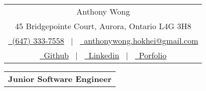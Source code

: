 \documentclass[a4paper,11pt]{article}
\begin{document}

\pagestyle{empty} 




\begin{tabularx}{\linewidth}{@{} C @{}}
\Huge{Anthony Wong} \\[7.5pt]
45 Bridgepointe Court, Aurora, Ontario L4G 3H8 \\
\href{tel:+1              (647) 333-7558}{\raisebox{-0.05\height}\               (647) 333-7558} \ $|$ \
\href{mailto:anthonywong.hokhei@gmail.com}{\raisebox{-0.05\height}\ anthonywong.hokhei@gmail.com} \\


        \href{https://github.com/anth0nywong}{\raisebox{-0.05\height}\ Github} \ $|$ \
        \href{https://www.linkedin.com/in/anth0nywong/}{\raisebox{-0.05\height}\ Linkedin} \ $|$ \
        \href{https://intro.anthonyhhwong.link/}{\raisebox{-0.05\height}\ Porfolio} \\
\end{tabularx}


\begin{tabularx}{\linewidth}{@{} C @{}}
\textbf{Junior Software Engineer} \\[7.5pt]
\end{tabularx}
\end{document}
